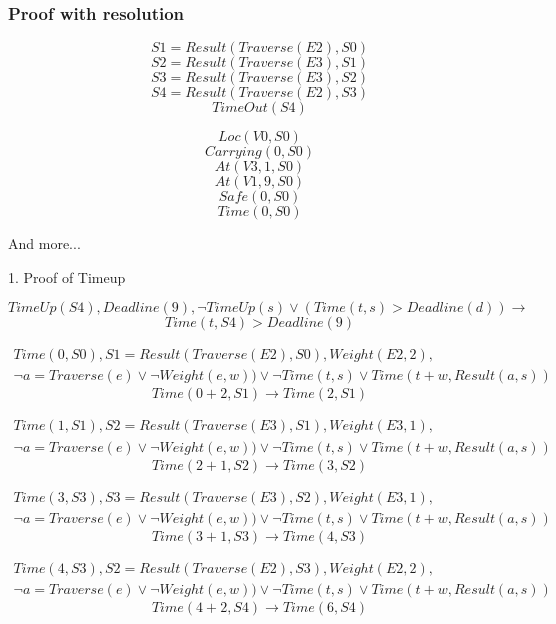 \documentclass{article}                     %
\begin{document}
	\subsubsection{Proof with resolution}
	$$ S1 = Result(Traverse(E2), S0) $$
	$$ S2 = Result(Traverse(E3), S1) $$
	$$ S3 = Result(Traverse(E3), S2) $$
	$$ S4 = Result(Traverse(E2), S3) $$
	$$ TimeOut(S4) $$
	
	$$ Loc(V0, S0) $$ 
	$$ Carrying(0, S0) $$ 
	$$ At(V3, 1, S0) $$ 
	$$ At(V1, 9, S0) $$  
	$$ Safe(0, S0) $$ 
	$$ Time(0, S0) $$ 
	
	And more...
	
	1. Proof of Timeup
	
	\begin{equation}\label{cnf:timeout}
	TimeUp(S4), Deadline(9), \neg TimeUp(s) \lor (Time(t, s) > Deadline(d)) \rightarrow
	\end{equation}
	$$ Time(t, S4) > Deadline(9) $$
	
	
	\begin{equation}\label{key}
	\begin{split}
	Time(0, S0), S1 = Result(Traverse(E2), S0), Weight(E2,2), \\
	 \neg a=Traverse(e) \lor \neg Weight(e, w)) \lor \neg Time(t, s)
	\lor 
	Time(t+w, Result(a, s))
	\end{split}
	\end{equation}
	$$ Time(0+2, S1) \rightarrow Time(2, S1) $$
	
	\begin{equation}\label{key}
	\begin{split}
	Time(1, S1), S2 = Result(Traverse(E3), S1), Weight(E3,1),  \\
	\neg a=Traverse(e) \lor \neg Weight(e, w)) \lor \neg Time(t, s)
	\lor 
	Time(t+w, Result(a, s))
	\end{split}
	\end{equation}	
	$$ Time(2+1, S2) \rightarrow Time(3, S2) $$	

	\begin{equation}\label{key}
	\begin{split}
	Time(3, S3), S3 = Result(Traverse(E3), S2), Weight(E3,1),  \\
	\neg a=Traverse(e) \lor \neg Weight(e, w)) \lor \neg Time(t, s)
	\lor 
	Time(t+w, Result(a, s))
	\end{split}
	\end{equation}	
	$$ Time(3+1, S3) \rightarrow Time(4, S3) $$	

	\begin{equation}\label{key}
	\begin{split}
	Time(4, S3), S2 = Result(Traverse(E2), S3), Weight(E2,2),  \\
	\neg a=Traverse(e) \lor \neg Weight(e, w)) \lor \neg Time(t, s)
	\lor 
	Time(t+w, Result(a, s))
	\end{split}
	\end{equation}	
	$$ Time(4+2, S4) \rightarrow Time(6, S4) $$	
	
\end{document}

